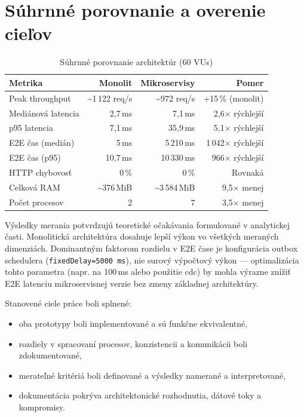 \section{Súhrnné porovnanie a overenie cieľov}

\begin{table}[H]
\centering
\begin{tabular}{|l|r|r|r|}
\hline
Metrika & Monolit & Mikroservisy & Pomer \\ \hline
Peak throughput     & \textasciitilde1\,122 req/s & \textasciitilde972 req/s & +15\,\% (monolit) \\ \hline
Mediánová latencia  & 2,7\,ms    & 7,1\,ms      & 2,6$\times$ rýchlejší \\ \hline
p95 latencia        & 7,1\,ms    & 35,9\,ms     & 5,1$\times$ rýchlejší \\ \hline
E2E čas (medián)    & 5\,ms      & 5\,210\,ms   & 1\,042$\times$ rýchlejší \\ \hline
E2E čas (p95)       & 10,7\,ms   & 10\,330\,ms  & 966$\times$ rýchlejší \\ \hline
HTTP chybovosť      & 0\,\%      & 0\,\%        & Rovnaká \\ \hline
Celková RAM         & \textasciitilde376\,MiB & \textasciitilde3\,584\,MiB & 9,5$\times$ menej \\ \hline
Počet procesov      & 2          & 7            & 3,5$\times$ menej \\ \hline
\end{tabular}
\caption{Súhrnné porovnanie architektúr (60 VUs)}
\label{tab:eval-summary}
\end{table}

Výsledky merania potvrdzujú teoretické očakávania formulované v analytickej časti. Monolitická architektúra dosahuje lepší výkon vo všetkých meraných dimenziách. Dominantným faktorom rozdielu v E2E čase je konfigurácia outbox schedulera (\texttt{fixedDelay=5000\,ms}), nie surový výpočtový výkon — optimalizácia tohto parametra (napr. na 100\,ms alebo použitie \gls{cdc}) by mohla výrazne znížiť E2E latenciu mikroservisnej verzie bez zmeny základnej architektúry.

Stanovené ciele práce boli splnené:
\begin{itemize}
    \item oba prototypy boli implementované a sú funkčne ekvivalentné,
    \item rozdiely v spracovaní procesov, konzistencii a komunikácii boli zdokumentované,
    \item merateľné kritériá boli definované a výsledky namerané a interpretované,
    \item dokumentácia pokrýva architektonické rozhodnutia, dátové toky a kompromisy.
\end{itemize}

